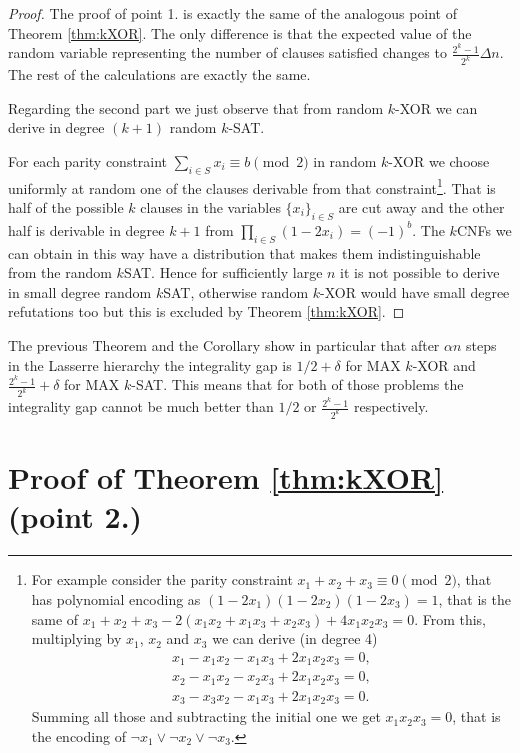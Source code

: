 \documentclass[a4paper,twoside,justified]{tufte-handout}
\begin{document}
\begin{proof}
The proof of point 1. is exactly the same of the analogous point of Theorem \ref{thm:kXOR}. 
The only difference is that the expected value of the random variable representing the number of clauses satisfied changes to $\frac{2^k-1}{2^k}\Delta n$. 
The rest of the calculations are exactly the same.

Regarding the second part we just observe that from random $k$-XOR we can derive in degree $(k+1)$ random $k$-SAT.

For each parity constraint $\sum_{i\in S}x_i\equiv b \pmod{2}$ in random $k$-XOR we choose uniformly at random one of the clauses derivable from that constraint\footnote{
For example consider the parity constraint $x_1+x_2+x_3\equiv 0 \pmod{2}$, that has polynomial encoding as $(1-2x_1)(1-2x_2)(1-2x_3)=1$, that is the same of 
$x_1+x_2+x_3-2(x_1x_2+x_1x_3+x_2x_3)+4x_1x_2x_3=0$. 
From this, multiplying by $x_1$, $x_2$ and $x_3$ we can derive (in degree 4)
\begin{equation*}
\begin{split}
x_1-x_1x_2-x_1x_3 +2x_1x_2x_3=0,\\
x_2 -x_1x_2-x_2x_3+2x_1x_2x_3=0,\\
x_3 -x_3x_2-x_1x_3+2x_1x_2x_3=0.
\end{split}
\end{equation*}
Summing all those and subtracting the initial one we get $x_1x_2x_3=0$, that is the encoding of $\neg x_1\vee \neg x_2 \vee \neg x_3$.
}.
That is half of the possible $k$ clauses in the variables $\{x_i\}_{i\in S}$ are cut away and the other half is derivable in degree $k+1$ from $\prod_{i\in S}(1-2x_i)=(-1)^b$. 
The $k$CNFs we can obtain in this way have a distribution that makes them indistinguishable from the random $k$SAT. Hence for sufficiently large $n$ it is not possible to derive in small degree random $k$SAT, otherwise random $k$-XOR would have small degree refutations too but this is excluded by Theorem \ref{thm:kXOR}.
\end{proof}

The previous Theorem and the Corollary show in particular that after $\alpha n$ steps in the Lasserre hierarchy the integrality gap is $1/2 +\delta$ for MAX $k$-XOR and $\frac{2^k-1}{2^k}+\delta$ for MAX $k$-SAT. 
This means that for both of those problems the integrality gap cannot be much better than $1/2$ or $\frac{2^k-1}{2^k}$ respectively.

\section{Proof of Theorem \ref{thm:kXOR} (point 2.)}
\end{document}
